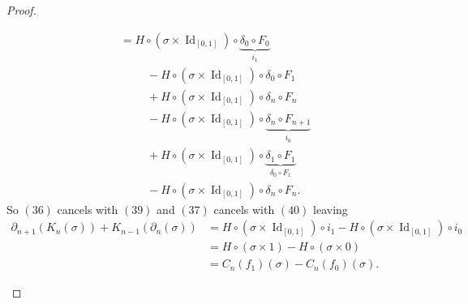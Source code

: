 \documentclass{article}
\newcommand{\id}[1]{\operatorname{Id}_{#1}}
\begin{document}
\begin{proof}
\begin{enumerate}[a.]
\begin{align}
      &= H\circ(\sigma \times \id{[0,1]}) \circ \underbrace{\delta_0 \circ F_0}_{i_1} \\
      &\hspace{1cm}- H\circ(\sigma \times \id{[0,1]}) \circ \delta_0 \circ F_1 \\
      &\hspace{1cm}+ H\circ(\sigma \times \id{[0,1]}) \circ \delta_n \circ F_n \\
      &\hspace{1cm}- H\circ(\sigma \times \id{[0,1]}) \circ \underbrace{\delta_n \circ F_{n+1}}_{i_0} \\
      &\hspace{1cm}+ H\circ(\sigma \times \id{[0,1]}) \circ \underbrace{\delta_1 \circ F_1}_{\delta_0 \circ F_1}\\
      &\hspace{1cm}- H\circ(\sigma \times \id{[0,1]}) \circ \delta_{n} \circ F_{n}.
    \end{align}
    So $(36)$ cancels with $(39)$ and $(37)$ cancels with $(40)$ leaving \begin{align*}
      \partial_{n+1}(K_n(\sigma)) + K_{n-1}(\partial_{n}(\sigma))
      &= H\circ(\sigma \times \id{[0,1]}) \circ i_1
      - H\circ(\sigma \times \id{[0,1]}) \circ i_0\\
      &= H\circ(\sigma \times 1)
      - H\circ(\sigma \times 0) \\
      &= C_n(f_1)(\sigma) - C_n(f_0)(\sigma).
    \end{align*}
  \end{enumerate}

\end{proof}
\pagebreak
\end{document}
